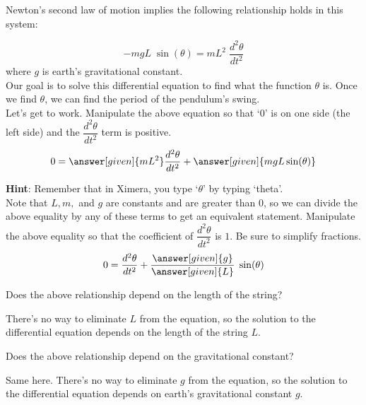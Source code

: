 \documentclass[handout,nooutcomes]{ximera}
\begin{document}
\begin{example}
\begin{explanation}
Newton's second law of motion implies the following 
relationship holds in this system:

\[
-m g L \phantom{.} \sin(\theta) = m L^2 \phantom{.}\dfrac{d^2 \theta}{d t^2}
\]
where $g$ is earth's gravitational constant.\\

Our goal is to solve this differential equation to find what the function
$\theta$ is. Once we find $\theta$, we can find the period of the pendulum's swing.\\

Let's get to work. Manipulate the above equation so that `$0$'
is on one side (the left side) and the $\dfrac{d^2 \theta}{d t^2}$ term
is positive.\\

\[
0 = \answer[given]{m L^2} \dfrac{d^2 \theta}{d t^2}  + \answer[given]{m g L \sin(\theta)}\\
\]

\textbf{Hint}: Remember that in Ximera, you type `$\theta$' by typing `theta'.\\


Note that $L,m,$ and $g$ are constants and are greater than $0$, so we can
divide the above equality by any of these terms to get an equivalent statement.
Manipulate the above equality so that the coefficient of $\dfrac{d^2 \theta}{d t^2}$
is $1$. Be sure to simplify fractions.\\

\[
0 = \dfrac{d^2 \theta}{d t^2}  + \dfrac{\answer[given]{g}}{\answer[given]{L}} \phantom{.} \sin(\theta)
\]
\end{explanation}
\end{example}

\begin{problem}
Does the above relationship depend on the length of the string?
\begin{multipleChoice}
\end{multipleChoice}
\begin{feedback}
There's no way to eliminate $L$ from the equation, so the solution
to the differential equation depends on the length of the string $L$.
\end{feedback}
\end{problem}

\begin{problem}
Does the above relationship depend on the gravitational constant?
\begin{multipleChoice}
\end{multipleChoice}
\begin{feedback}
Same here. There's no way to eliminate $g$ from the equation, so the solution
to the differential equation depends on earth's gravitational
constant $g$.
\end{feedback}
\end{problem}
\end{document}
